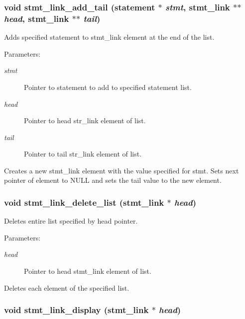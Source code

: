 \subsubsection{\setlength{\rightskip}{0pt plus 5cm}void stmt\_\-link\_\-add\_\-tail ({\bf statement} $\ast$ {\em stmt}, {\bf stmt\_\-link} $\ast$$\ast$ {\em head}, {\bf stmt\_\-link} $\ast$$\ast$ {\em tail})}\label{link_8c_a2}


Adds specified statement to stmt\_\-link element at the end of the list.

\begin{Desc}
\item[Parameters: ]\par
\begin{description}
\item[{\em 
stmt}]Pointer to statement to add to specified statement list. \item[{\em 
head}]Pointer to head str\_\-link element of list. \item[{\em 
tail}]Pointer to tail str\_\-link element of list.\end{description}
\end{Desc}
Creates a new stmt\_\-link element with the value specified for stmt. Sets next pointer of element to NULL and sets the tail value to the new element. 
\subsubsection{\setlength{\rightskip}{0pt plus 5cm}void stmt\_\-link\_\-delete\_\-list ({\bf stmt\_\-link} $\ast$ {\em head})}\label{link_8c_a18}


Deletes entire list specified by head pointer.

\begin{Desc}
\item[Parameters: ]\par
\begin{description}
\item[{\em 
head}]Pointer to head stmt\_\-link element of list.\end{description}
\end{Desc}
Deletes each element of the specified list. 
\subsubsection{\setlength{\rightskip}{0pt plus 5cm}void stmt\_\-link\_\-display ({\bf stmt\_\-link} $\ast$ {\em head})}\label{link_8c_a7}



